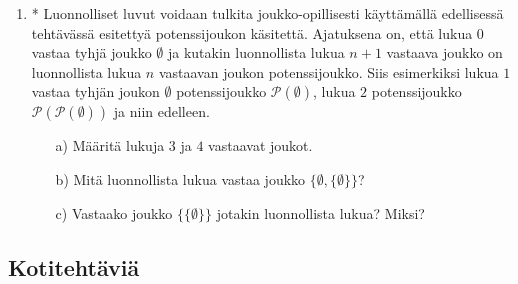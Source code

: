 \begin{enumerate}
\item * %
Luonnolliset luvut voidaan tulkita joukko-opillisesti käyttämällä edellisessä tehtävässä esitettyä potenssijoukon käsitettä. Ajatuksena on, että lukua $0$ vastaa tyhjä joukko $\emptyset$ ja kutakin luonnollista lukua $n + 1$ vastaava joukko on luonnollista lukua $n$ vastaavan joukon potenssijoukko. Siis esimerkiksi lukua $1$ vastaa tyhjän joukon $\emptyset$ potenssijoukko $\mathcal{P}(\emptyset)$, lukua $2$ potenssijoukko $\mathcal{P}(\mathcal{P}(\emptyset))$ ja niin edelleen.
\begin{itemize}
\item[a)] Määritä lukuja $3$ ja $4$ vastaavat joukot.
\item[b)] Mitä luonnollista lukua vastaa joukko $\{\emptyset,\{\emptyset\}\}$?
\item[c)] Vastaako joukko $\{\{\emptyset\}\}$ jotakin luonnollista lukua? Miksi?
\end{itemize}

\end{enumerate}

\subsection*{Kotitehtäviä}

